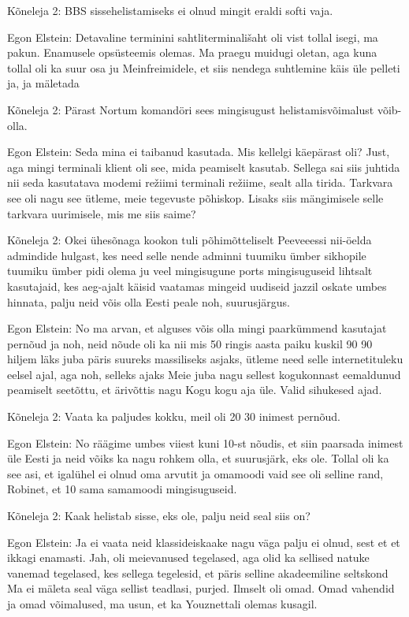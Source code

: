Kõneleja 2:
BBS sissehelistamiseks ei olnud mingit eraldi softi vaja.
                 
Egon Elstein:
Detavaline terminini sahtliterminališaht oli vist tollal isegi, ma pakun. Enamusele opsüsteemis olemas.
Ma praegu muidugi oletan, aga kuna tollal oli ka suur osa ju Meinfreimidele, et siis nendega suhtlemine käis üle pelleti ja, ja mäletada
                 
Kõneleja 2:
Pärast Nortum komandöri sees mingisugust helistamisvõimalust võib-olla.
                 
Egon Elstein:
Seda mina ei taibanud kasutada.
Mis kellelgi käepärast oli? Just, aga mingi terminali klient oli see, mida peamiselt kasutab. Sellega sai siis juhtida nii seda kasutatava modemi režiimi terminali režiime, sealt alla tirida. Tarkvara see oli nagu see ütleme, meie tegevuste põhiskop. Lisaks siis mängimisele selle tarkvara uurimisele, mis me siis saime?
                 
Kõneleja 2:
Okei ühesõnaga kookon tuli põhimõtteliselt Peeveeessi nii-öelda admindide hulgast, kes need selle nende adminni tuumiku ümber sikhopile tuumiku ümber pidi olema ju veel mingisugune ports mingisuguseid lihtsalt kasutajaid, kes aeg-ajalt käisid vaatamas mingeid uudiseid jazzil oskate umbes hinnata, palju neid võis olla Eesti peale noh, suurusjärgus.
                 
Egon Elstein:
No ma arvan, et alguses võis olla mingi paarkümmend kasutajat pernõud ja noh, neid nõude oli ka nii mis 50 ringis aasta paiku kuskil 90 90 hiljem läks juba päris suureks massiliseks asjaks, ütleme need selle internetituleku eelsel ajal, aga noh, selleks ajaks Meie juba nagu sellest kogukonnast eemaldunud peamiselt seetõttu, et ärivõttis nagu
Kogu kogu aja üle. Valid sihukesed ajad.
                 
Kõneleja 2:
Vaata ka paljudes kokku, meil oli 20 30 inimest pernõud.
                 
Egon Elstein:
No räägime umbes viiest kuni 10-st nõudis, et siin paarsada inimest üle Eesti ja neid võiks ka nagu rohkem olla, et suurusjärk, eks ole. Tollal oli ka see asi, et igalühel ei olnud oma arvutit ja omamoodi vaid see oli selline rand, Robinet, et 10 sama samamoodi mingisuguseid.
                 
Kõneleja 2:
Kaak helistab sisse, eks ole, palju neid seal siis on?
                 
Egon Elstein:
Ja ei vaata neid klassideiskaake nagu väga palju ei olnud, sest et et ikkagi enamasti.
Jah, oli meievanused tegelased, aga olid ka sellised natuke vanemad tegelased, kes sellega tegelesid, et päris selline akadeemiline seltskond
Ma ei mäleta seal väga sellist teadlasi, purjed.
Ilmselt oli omad.
Omad vahendid ja omad võimalused, ma usun, et ka Youznettali olemas kusagil.
                 
